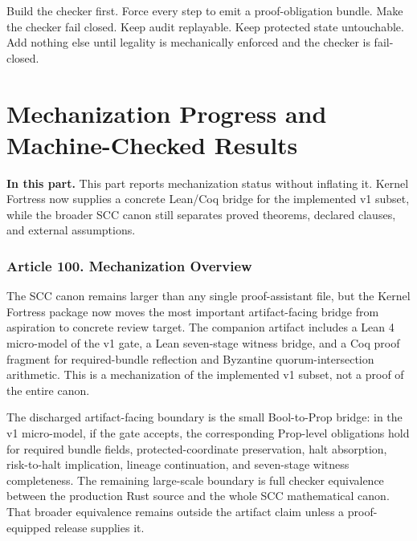 \documentclass[10pt,oneside]{article}
\theoremstyle{definition}
\theoremstyle{remark}
\newcommand{\PartIntro}[1]{\noindent\textbf{In this part.} #1\par\medskip}
\begin{document}
Build the checker first. Force every step to emit a proof-obligation bundle. Make the checker fail closed. Keep audit replayable. Keep protected state untouchable. Add nothing else until legality is mechanically enforced and the checker is fail-closed.

\part{Mechanization Progress and Machine-Checked Results}

\PartIntro{This part reports mechanization status without inflating it. Kernel Fortress now supplies a concrete Lean/Coq bridge for the implemented v1 subset, while the broader SCC canon still separates proved theorems, declared clauses, and external assumptions.}

\section{Article 100. Mechanization Overview}
The SCC canon remains larger than any single proof-assistant file, but the Kernel Fortress package now moves the most important artifact-facing bridge from aspiration to concrete review target. The companion artifact includes a Lean 4 micro-model of the v1 gate, a Lean seven-stage witness bridge, and a Coq proof fragment for required-bundle reflection and Byzantine quorum-intersection arithmetic. This is a mechanization of the implemented v1 subset, not a proof of the entire canon.

The discharged artifact-facing boundary is the small Bool-to-Prop bridge: in the v1 micro-model, if the gate accepts, the corresponding Prop-level obligations hold for required bundle fields, protected-coordinate preservation, halt absorption, risk-to-halt implication, lineage continuation, and seven-stage witness completeness. The remaining large-scale boundary is full checker equivalence between the production Rust source and the whole SCC mathematical canon. That broader equivalence remains outside the artifact claim unless a proof-equipped release supplies it.
\end{document}
